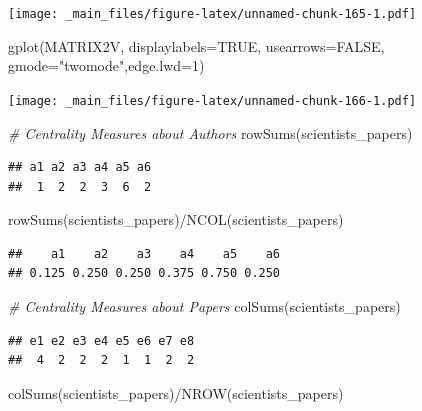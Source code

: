 \documentclass[
  notitlepage,
  onecolumn,
  openany]{book}
\newenvironment{Shaded}{\begin{snugshade}}{\end{snugshade}}
\newcommand{\AttributeTok}[1]{\textcolor[rgb]{0.77,0.63,0.00}{#1}}
\newcommand{\CommentTok}[1]{\textcolor[rgb]{0.56,0.35,0.01}{\textit{#1}}}
\newcommand{\ConstantTok}[1]{\textcolor[rgb]{0.00,0.00,0.00}{#1}}
\newcommand{\DecValTok}[1]{\textcolor[rgb]{0.00,0.00,0.81}{#1}}
\newcommand{\FunctionTok}[1]{\textcolor[rgb]{0.00,0.00,0.00}{#1}}
\newcommand{\NormalTok}[1]{#1}
\newcommand{\SpecialCharTok}[1]{\textcolor[rgb]{0.00,0.00,0.00}{#1}}
\newcommand{\StringTok}[1]{\textcolor[rgb]{0.31,0.60,0.02}{#1}}
\begin{document}
\texttt{[image: \_main\_files/figure-latex/unnamed-chunk-165-1.pdf]}

\begin{Shaded}
\begin{Highlighting}[]
\FunctionTok{gplot}\NormalTok{(MATRIX2V, }\AttributeTok{displaylabels=}\ConstantTok{TRUE}\NormalTok{, }
      \AttributeTok{usearrows=}\ConstantTok{FALSE}\NormalTok{, }\AttributeTok{gmode=}\StringTok{"twomode"}\NormalTok{,}\AttributeTok{edge.lwd=}\DecValTok{1}\NormalTok{)}
\end{Highlighting}
\end{Shaded}

\texttt{[image: \_main\_files/figure-latex/unnamed-chunk-166-1.pdf]}

\begin{Shaded}
\begin{Highlighting}[]
\CommentTok{\# Centrality Measures about Authors}
\FunctionTok{rowSums}\NormalTok{(scientists\_papers)}
\end{Highlighting}
\end{Shaded}

\begin{verbatim}
## a1 a2 a3 a4 a5 a6 
##  1  2  2  3  6  2
\end{verbatim}

\begin{Shaded}
\begin{Highlighting}[]
\FunctionTok{rowSums}\NormalTok{(scientists\_papers)}\SpecialCharTok{/}\FunctionTok{NCOL}\NormalTok{(scientists\_papers)}
\end{Highlighting}
\end{Shaded}

\begin{verbatim}
##    a1    a2    a3    a4    a5    a6 
## 0.125 0.250 0.250 0.375 0.750 0.250
\end{verbatim}

\begin{Shaded}
\begin{Highlighting}[]
\CommentTok{\# Centrality Measures about Papers}
\FunctionTok{colSums}\NormalTok{(scientists\_papers)}
\end{Highlighting}
\end{Shaded}

\begin{verbatim}
## e1 e2 e3 e4 e5 e6 e7 e8 
##  4  2  2  2  1  1  2  2
\end{verbatim}

\begin{Shaded}
\begin{Highlighting}[]
\FunctionTok{colSums}\NormalTok{(scientists\_papers)}\SpecialCharTok{/}\FunctionTok{NROW}\NormalTok{(scientists\_papers)}
\end{Highlighting}
\end{Shaded}
\end{document}
